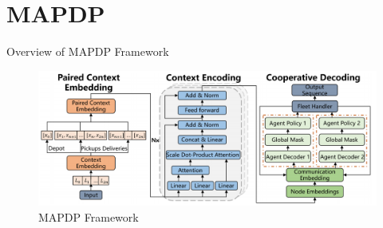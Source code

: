 \documentclass{beamer}
\begin{document}


\section{MAPDP}

\begin{frame}{Overview of MAPDP Framework}
	\begin{figure}
		\centering
		\hspace{-1.2cm} %
		\includegraphics[scale=0.199]{model_structure.png}
		\caption{MAPDP Framework}
	\end{figure}
\end{frame}
\end{document}
